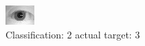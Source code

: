 \begin{figure}[h!]
\begin{center}
\includegraphics[width=0.60\columnwidth]{figures/ID1095_class_2_target_3.png}
\end{center}
\caption{ Classification: 2 actual target: 3}
\label{fig:ID1095_class_2_target_3}
\end{figure}
